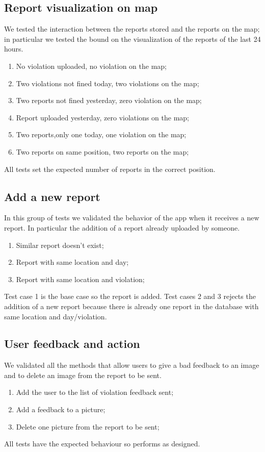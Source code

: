 \documentclass[../ITD.tex]{subfiles}
\begin{document}
    \subsection{Report visualization on map}\label{subsec:report-visualization-on-map}
    We tested the interaction between the reports stored and the reports on the map;
    in particular we tested the bound on the visualization of the reports of the last 24 hours.
    \begin{enumerate}
        \item No violation uploaded, no violation on the map;
        \item Two violations not fined today, two violations on the map;
        \item Two reports not fined yesterday, zero violation on the map;
        \item Report uploaded yesterday, zero violations on the map;
        \item Two reports,only one today, one violation on the map;
        \item Two reports on same position, two reports on the map;
    \end{enumerate}
    All tests set the expected number of reports in the correct position.

    \subsection{Add a new report}\label{subsec:add-a-new-report}
    In this group of tests we validated the behavior of the app when it receives a new report.
    In particular the addition of a report already uploaded by someone.
    \begin{enumerate}
        \item Similar report doesn't exist;
        \item Report with same location and day;
        \item Report with same location and violation;
    \end{enumerate}
    Test case 1 is the base case so the report is added.
    \newline Test cases 2 and 3 rejects the addition of a new report because there is already one report in the database with same location and day/violation.

    \subsection{User feedback and action}\label{subsec:user-feedback-and-action}
    We validated all the methods that allow users to give a bad feedback to an image and to delete an image from the report to be sent.
    \begin{enumerate}
        \item Add the user to the list of violation feedback sent;
        \item Add a feedback to a picture;
        \item Delete one picture from the report to be sent;
    \end{enumerate}
    All tests have the expected behaviour so performs as designed.
\end{document}
